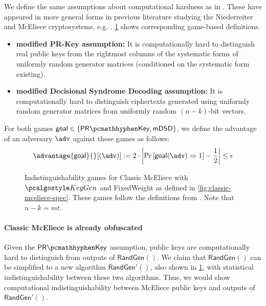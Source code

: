 We define the same assumptions about computational hardness as in \cite[Definition~K.1]{EC:Xagawa22}. These have appeared in more general forms in previous literature studying the Niederreiter and McEliece cryptosystems, e.g. \cite{AC:CouFinSen01,EC:SaiXagYam18}. \cref{fig:classic-mceliece-assumptions} shows corresponding game-based definitions.
\begin{itemize}
    \item \textbf{modified PR-Key assumption:} It is computationally hard to distinguish real public keys from the rightmost columns of the systematic forms of uniformly random generator matrices (conditioned on the systematic form existing).
    \item \textbf{modified Decisional Syndrome Decoding assumption:} It is computationally hard to distinguish ciphertexts generated using uniformly random generator matrices from uniformly random $(n-k)$-bit vectors.
\end{itemize}

For both games $\mathsf{goal} \in \{\prkey, \mdsd\}$, we define the advantage of an adversary $\adv$ against these games as follows:
\[ \advantage{\mathsf{goal}}{}[(\adv)] := 2 \cdot \left| \Pr\left[\mathsf{goal}(\adv) \Rightarrow 1\right] - \frac{1}{2} \right| \leq \epsilon \]

\begin{figure}
    
    \caption[
        Indistinguishability games for Classic McEliece.
    ]{
        Indistinguishability games for Classic McEliece with $\kgen$ and \textsf{FixedWeight} as defined in \cref{fig:classic-mceliece-spec}. These games follow the definitions from \cite[Definition~K.1]{EC:Xagawa22}. Note that $n-k = mt$.}
    \label{fig:classic-mceliece-assumptions}
\end{figure}

\paragraph{Classic McEliece is already obfuscated}

Given the $\prkey$ assumption, public keys are computationally hard to distinguish from outputs of $\textsf{RandGen}()$. We claim that $\textsf{RandGen}()$ can be simplified to a new algorithm $\textsf{RandGen}'()$, also shown in \cref{fig:classic-mceliece-assumptions}, with statistical indistinguishability between these two algorithms. Thus, we would show computational indistinguishability between McEliece public keys and outputs of $\textsf{RandGen}'()$.

